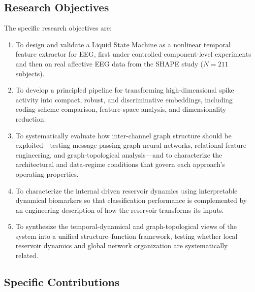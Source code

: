 \subsection{Research Objectives}

The specific research objectives are:
\begin{enumerate}
    \item To design and validate a Liquid State Machine as a nonlinear temporal feature extractor for EEG, first under controlled component-level experiments and then on real affective EEG data from the SHAPE study ($N = 211$ subjects).
    \item To develop a principled pipeline for transforming high-dimensional spike activity into compact, robust, and discriminative embeddings, including coding-scheme comparison, feature-space analysis, and dimensionality reduction.
    \item To systematically evaluate how inter-channel graph structure should be exploited---testing message-passing graph neural networks, relational feature engineering, and graph-topological analysis---and to characterize the architectural and data-regime conditions that govern each approach's operating properties.
    \item To characterize the internal driven reservoir dynamics using interpretable dynamical biomarkers so that classification performance is complemented by an engineering description of how the reservoir transforms its inputs.
    \item To synthesize the temporal-dynamical and graph-topological views of the system into a unified structure--function framework, testing whether local reservoir dynamics and global network organization are systematically related.
\end{enumerate}

\subsection{Specific Contributions}

